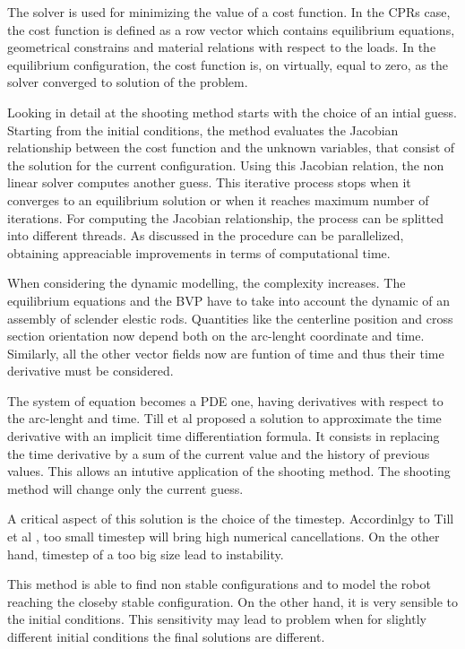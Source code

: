 \documentclass{thesisreport}
\begin{document}
 The solver is used for minimizing the value of a cost function\cite{florian_geometrically_2020}. In the CPRs case, the cost function is defined as a row vector which contains equilibrium equations, geometrical constrains and material relations with respect to the loads. In the equilibrium configuration, the cost function is, on virtually, equal to zero, as the solver converged to solution of the problem. 
 
 Looking in detail at the shooting method starts with the choice of an intial guess. Starting from the initial conditions, the method evaluates the Jacobian relationship between the cost function and the unknown variables, that consist of the solution for the current configuration. Using this Jacobian relation, the non linear solver computes another guess. This iterative process stops when it converges to an equilibrium solution or when it reaches maximum number of iterations. For computing the Jacobian relationship, the process can be splitted into different threads. As discussed in \cite{till_efficient_2015} the procedure can be parallelized, obtaining appreaciable improvements in terms of computational time.  
 
 When considering the dynamic modelling, the complexity increases. The equilibrium equations and the BVP have to take into account the dynamic of an assembly of sclender elestic rods. Quantities like the centerline position and cross section orientation now depend both on the arc-lenght coordinate and time. Similarly, all the other vector fields now are funtion of time and thus their time derivative must be considered. 
 
 The system of equation becomes a PDE one, having derivatives with respect to the arc-lenght and time. Till et al \cite{till_real-time_2019} proposed a solution to approximate the time derivative with an implicit time differentiation formula. It consists in replacing the time derivative by a sum of the current value and the history of previous values. This allows an intutive application of the shooting method. The shooting method will change only the current guess. 
 
 A critical aspect of this solution is the choice of the timestep. Accordinlgy to Till et al \cite{till_real-time_2019}, too small timestep will bring high numerical cancellations. On the other hand, timestep of a too big size lead to instability. 
 
 This method is able to find non stable configurations and to model the robot reaching the closeby stable configuration. On the other hand, it is very sensible to the initial conditions. This sensitivity may lead to problem when for slightly different initial conditions the final solutions are different. 
 
\end{document}

